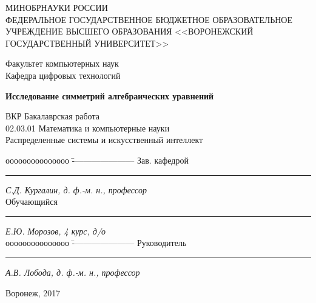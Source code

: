 \documentclass[a4paper,14pt]{extarticle}
\date{}                                           %
\begin{document}
\begin{titlepage}

\thispagestyle{empty}
\center 
\textsc{МИНОБРНАУКИ РОССИИ}\\
\textsc{ФЕДЕРАЛЬНОЕ ГОСУДАРСТВЕННОЕ БЮДЖЕТНОЕ ОБРАЗОВАТЕЛЬНОЕ УЧРЕЖДЕНИЕ ВЫСШЕГО ОБРАЗОВАНИЯ <<ВОРОНЕЖСКИЙ ГОСУДАРСТВЕННЫЙ УНИВЕРСИТЕТ>>}

\vspace{0.3cm}

\textrm{Факультет компьютерных наук}\\
\textrm{Кафедра цифровых технологий}

\vspace{1cm}

\textbf{Исследование симметрий алгебраических уравнений}\\

\vspace{1cm}

\textrm{ВКР Бакалаврская работа}\\
\textrm{02.03.01 Математика и компьютерные науки}\\
\textrm{Распределенные системы и искусственный интеллект}\\

\vfill
{}
\begin{tabbing}
ооооооооооооооо	\=	----------------------	\kill
Зав. кафедрой	\> 	\rule[0mm]{5cm}{0,3mm}	\textit{С.Д. Кургалин, д. ф.-м. н., профессор}  \\
Обучающийся 	\> 	\rule[0mm]{5cm}{0,3mm}	\textit{Е.Ю. Морозов, 4 курс, д/о} \\ 
ооооооооооооооо	\=	----------------------	\kill
Руководитель	\> 	\rule[0mm]{5cm}{0,3mm}  \textit{А.В. Лобода, д. ф.-м. н., профессор}
\end{tabbing}

\vfill

\centerline{Воронеж, 2017}
\clearpage
\end{titlepage}
\newpage\thispagestyle{empty}
\addtocounter{page}{1}
\end{document}
